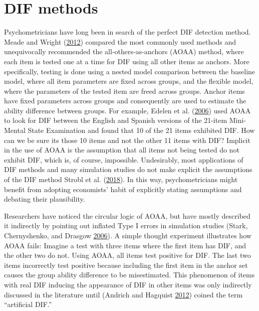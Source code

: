 \documentclass[
  11pt,
]{article}
\begin{document}
\hypertarget{dif-methods}{%
\section{DIF methods}\label{dif-methods}}

Psychometricians have long been in search of the perfect DIF detection method. Meade and Wright (\protect\hyperlink{ref-meade2012solving}{2012}) compared the most commonly used methods and unequivocally recommended the all-others-as-anchors (AOAA) method, where each item is tested one at a time for DIF using all other items as anchors. More specifically, testing is done using a nested model comparison between the baseline model, where all item parameters are fixed across groups, and the flexible model, where the parameters of the tested item are freed across groups. Anchor items have fixed parameters across groups and consequently are used to estimate the ability difference between groups. For example, Edelen et al. (\protect\hyperlink{ref-edelen2006identification}{2006}) used AOAA to look for DIF between the English and Spanish versions of the 21-item Mini-Mental State Examination and found that 10 of the 21 items exhibited DIF. How can we be sure its those 10 items and not the other 11 items with DIF? Implicit in the use of AOAA is the assumption that all items not being tested do not exhibit DIF, which is, of course, impossible. Undesirably, most applications of DIF methods and many simulation studies do not make explicit the assumptions of the DIF method Strobl et al. (\protect\hyperlink{ref-strobl2018anchor}{2018}). In this way, psychometricians might benefit from adopting economists' habit of explicitly stating assumptions and debating their plausibility.

Researchers have noticed the circular logic of AOAA, but have mostly described it indirectly by pointing out inflated Type I errors in simulation studies (Stark, Chernyshenko, and Drasgow \protect\hyperlink{ref-stark2006detecting}{2006}). A simple thought experiment illustrates how AOAA fails: Imagine a test with three items where the first item has DIF, and the other two do not. Using AOAA, all items test positive for DIF. The last two items incorrectly test positive because including the first item in the anchor set causes the group ability difference to be misestimated. This phenomenon of items with real DIF inducing the appearance of DIF in other items was only indirectly discussed in the literature until (Andrich and Hagquist \protect\hyperlink{ref-andrich2012real}{2012}) coined the term \enquote{artificial DIF.}
\end{document}
